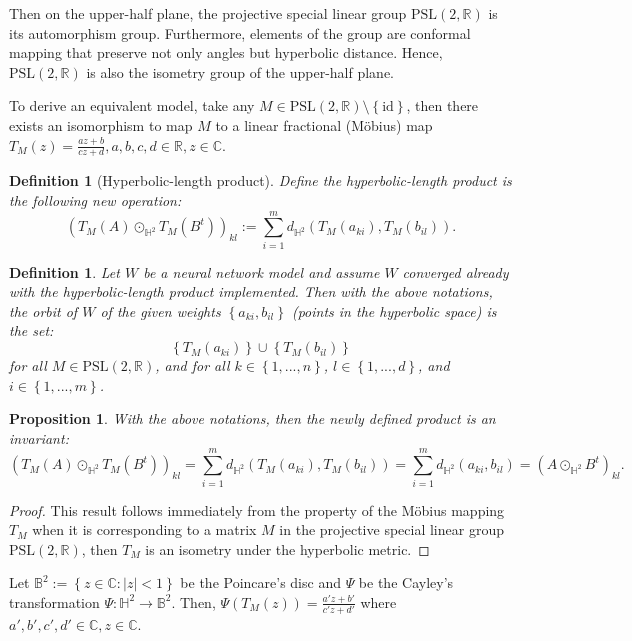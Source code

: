 \documentclass{article}
\theoremstyle{plain}
\theoremstyle{plain} %
\newtheorem{proposition}{Proposition}
\newtheorem{definition}[theorem]{Definition}
\theoremstyle{definition}  %
\theoremstyle{remark}  %
\theoremstyle{plain}
\begin{document}
Then on the upper-half plane, the projective special linear group $\text{PSL}(2,\mathbb{R})$ is its automorphism group. Furthermore, elements of the group are conformal mapping that preserve not only angles but hyperbolic distance. Hence, $\text{PSL}(2,\mathbb{R})$ is also the isometry group of the upper-half plane.


To derive an equivalent model, take any $M\in \text{PSL}(2,\mathbb{R})\setminus\left\lbrace \text{id}\right\rbrace$, then there exists an isomorphism to map $M$ to a linear fractional (M\"{o}bius) map $T_M(z)=\frac{az+b}{cz+d}, a,b,c,d\in\mathbb{R},z\in\mathbb{C}$.
\begin{definition}[Hyperbolic-length product]
Define \textit{the hyperbolic-length product} is the following new operation: 
$$
\left( T_M(A) \odot_{\mathbb{H}^2} T_M(B^t)\right)_{kl} := \sum\limits_{i=1}^m d_{\mathbb{H}^2} \left(T_M \left( a_{ki} \right) ,T_M\left( b_{il}\right) \right).
$$
\end{definition}
\begin{definition}
Let $W$ be a neural network model and assume $W$ converged already with the hyperbolic-length product implemented. Then with the above notations, the orbit of $W$ of the given weights $\left\lbrace a_{ki},  b_{il}\right\rbrace$ (points in the hyperbolic space) is the set:
$$
\left\lbrace T_M(a_{ki}) \right\rbrace \cup \left\lbrace T_M(b_{il}) \right\rbrace
$$
for all $M\in \text{PSL}(2,\mathbb{R})$, and for all $k\in\left\lbrace 1,...,n\right\rbrace$, $l\in\left\lbrace 1,...,d\right\rbrace$, and $i\in\left\lbrace 1,...,m\right\rbrace$.
\end{definition}
\begin{proposition}
With the above notations, then the newly defined product is an invariant:
$$
\left( T_M(A) \odot_{\mathbb{H}^2} T_M(B^t)\right)_{kl} = \sum\limits_{i=1}^m d_{\mathbb{H}^2} \left(T_M \left( a_{ki} \right) ,T_M\left( b_{il}\right) \right)
=  \sum\limits_{i=1}^m d_{\mathbb{H}^2} \left( a_{ki}  , b_{il} \right)  =\left( A\odot_{\mathbb{H}^2} B^t\right)_{kl}.$$
\end{proposition}
\begin{proof}
This result follows immediately from the property of the M\"{o}bius mapping $T_M$ when it is corresponding to a matrix $M$ in the projective special linear group $\text{PSL}(2,\mathbb{R})$, then $T_M$ is an isometry under the hyperbolic metric.
\end{proof}
Let $\mathbb{B}^2:=\left\lbrace z\in\mathbb{C} : \vert z \vert <1\right\rbrace$ be the Poincare's disc and $\Psi$ be the Cayley's transformation $\Psi: \mathbb{H}^2 \to \mathbb{B}^2$. Then, $\Psi\left( T_M(z)\right)=\frac{a'z+b'}{c'z+d'}$ where $a',b',c',d'\in\mathbb{C},z\in\mathbb{C}$.
\end{document}
